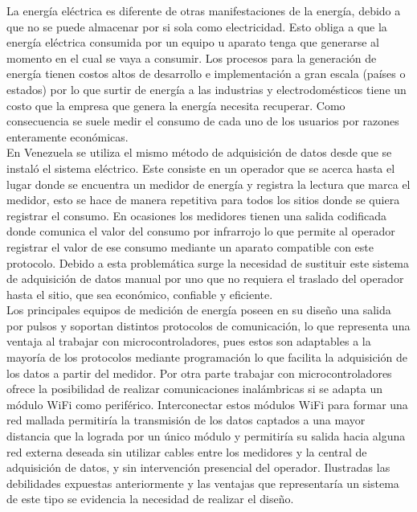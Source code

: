 \documentclass[12pt,letterpaper]{article}
\begin{document}
La energía eléctrica es diferente de otras manifestaciones de la energía, debido a que no se puede almacenar por si sola como electricidad. Esto obliga a que la energía eléctrica consumida por un equipo u aparato tenga que generarse al momento en el cual se vaya a consumir. Los procesos para la generación de energía tienen costos altos de desarrollo e implementación a gran escala (países o estados) por lo que surtir de energía a las industrias y electrodomésticos tiene un costo que la empresa que genera la energía necesita recuperar. Como consecuencia se suele medir el consumo de cada uno de los usuarios por razones enteramente económicas.\\


En Venezuela se utiliza el mismo método de adquisición de datos desde que se instaló el sistema eléctrico. Este consiste en un operador que se acerca hasta el lugar donde se encuentra un medidor de energía y registra la lectura que marca el medidor, esto se hace de manera repetitiva para todos los sitios donde se quiera registrar el consumo. En ocasiones los medidores tienen una salida codificada donde comunica el valor del consumo por infrarrojo lo que permite al operador registrar el valor de ese consumo mediante un aparato compatible con este protocolo. Debido a esta problemática surge la necesidad de sustituir este sistema de adquisición de datos manual por uno que no requiera el traslado del operador hasta el sitio, que sea económico, confiable y eficiente.\\


Los principales equipos de medición de energía poseen en su diseño una salida por pulsos y soportan distintos protocolos de comunicación, lo que representa una ventaja al trabajar con microcontroladores, pues estos son adaptables a la mayoría de los protocolos mediante programación lo que facilita la adquisición de los datos a partir del medidor. Por otra parte trabajar con microcontroladores ofrece la posibilidad de realizar comunicaciones inalámbricas si se adapta un módulo WiFi como periférico. Interconectar estos módulos WiFi para formar una red mallada permitiría la transmisión de los datos captados a una mayor distancia que la lograda por un único módulo y permitiría su salida hacia alguna red externa deseada sin utilizar cables entre los medidores y la central de adquisición de datos, y sin intervención presencial del operador. Ilustradas las debilidades expuestas anteriormente y las ventajas que representaría un sistema de este tipo se evidencia la necesidad de realizar el diseño.\\
\end{document}
